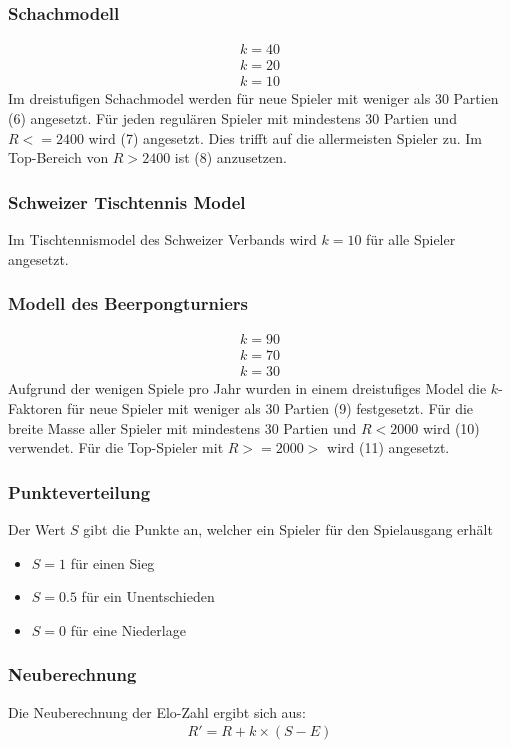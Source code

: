 \documentclass[a4paper, 12pt]{article}
\newcounter{arti}
\begin{document}
\subsubsection{Schachmodell}
\begin{align}
k=40
\\k=20
\\k=10
\end{align}
Im dreistufigen Schachmodel werden für neue Spieler mit weniger als 30 Partien (6) angesetzt.
Für jeden regulären Spieler mit mindestens 30 Partien und \(R <= 2400\) wird (7) angesetzt. Dies trifft auf die allermeisten Spieler zu.
Im Top-Bereich von \(R > 2400 \) ist (8) anzusetzen.
\subsubsection{Schweizer Tischtennis Model}
Im Tischtennismodel des Schweizer Verbands wird \(k=10\) für alle Spieler angesetzt.
\subsubsection{Modell des Beerpongturniers}
\begin{align}
k=90
\\k=70
\\k=30
\end{align}
Aufgrund der wenigen Spiele pro Jahr wurden in einem dreistufiges Model die \(k\)-Faktoren für neue Spieler mit weniger als 30 Partien (9) festgesetzt. Für die breite Masse aller Spieler mit mindestens 30 Partien und \(R< 2000\) wird (10) verwendet. Für die Top-Spieler mit \(R>=2000>\) wird (11) angesetzt.
\subsubsection{Punkteverteilung}
Der Wert \(S\) gibt die Punkte an, welcher ein Spieler für den Spielausgang erhält
\begin{itemize}
\item \(S = 1\) für einen Sieg
\item \(S = 0.5\) für ein Unentschieden
\item \(S = 0\) für eine Niederlage
\end{itemize}

\subsubsection{Neuberechnung}
Die Neuberechnung der Elo-Zahl ergibt sich aus:
\begin{align}
R' = R + k\times(S-E)
\end{align}
\end{document}
